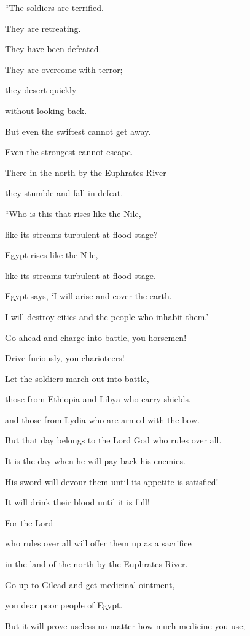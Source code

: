 {\par }{\Q “The soldiers
are terrified.
\par }{\Q They
are retreating.
\par }{\Q They have been defeated.
\par }{\Q They are overcome with terror;
\par }{\Q they desert quickly
\par }{\Q without
looking back.
\par }{\Q {}But even
the swiftest
cannot get away.
\par }{\Q Even
the strongest
cannot escape.
\par }{\Q There in the north
by
the Euphrates
River
\par }{\Q they stumble
and fall in defeat.
\par }{\Q {}“Who
is this
that rises
like the Nile,
\par }{\Q like its streams
turbulent
at flood stage?
\par }{\Q {}Egypt
rises
like the Nile,
\par }{\Q like its streams
turbulent
at flood
stage.
\par }{\Q Egypt says,
‘I will arise
and cover
the earth.
\par }{\Q I will destroy
cities
and the people who inhabit them.’
\par }{\Q {}Go ahead and charge into battle,
you horsemen!
\par }{\Q Drive furiously,
you charioteers!
\par }{\Q Let the soldiers
march out
into battle,
\par }{\Q those from Ethiopia
and Libya
who carry
shields,
\par }{\Q and those from Lydia
who are armed
with the bow.
\par }{\Q {}But that
day
belongs to the Lord
God
who rules over all.
\par }{\Q It is the day
when he will pay back
his enemies.
\par }{\Q His sword
will devour
them until its appetite is satisfied!
\par }{\Q It will drink
their blood
until
it is full!

\par }{\Q For
the Lord

{}
who rules over all
will offer
them up as a sacrifice
\par }{\Q in the land
of the north
by
the Euphrates
River.
\par }{\Q {}Go up
to Gilead
and get
medicinal ointment,
\par }{\Q you dear poor people
of Egypt.
\par }{\Q But it will prove useless
no matter how much
medicine
you use;

}
